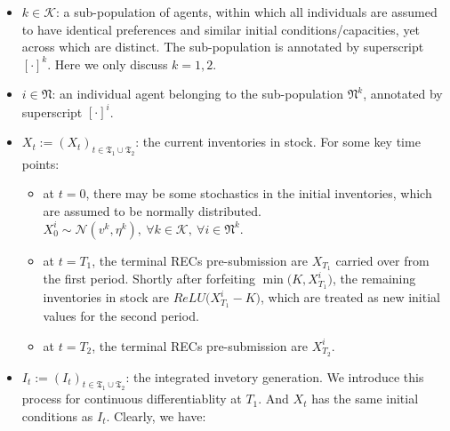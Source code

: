 \documentclass[
]{article}
\providecommand{\tightlist}{%
  \setlength{\itemsep}{0pt}\setlength{\parskip}{0pt}}
\begin{document}
\begin{itemize}
\item
  \(k \in \mathcal{K}\): a sub-population of agents, within which all
  individuals are assumed to have identical preferences and similar
  initial conditions/capacities, yet across which are distinct. The
  sub-population is annotated by superscript \([\cdot]^{k}\). Here we
  only discuss \(k=1,2\).
\item
  \(i \in \mathfrak{N}\): an individual agent belonging to the
  sub-population \(\mathfrak{N}^k\), annotated by superscript
  \([\cdot]^{i}\).
\item
  \(X_t := (X_t)_{t\in\mathfrak{T_1} \cup \mathfrak{T_2}}\): the current
  inventories in stock. For some key time points:

  \begin{itemize}
  \tightlist
  \item
    at \(t=0\), there may be some stochastics in the initial
    inventories, which are assumed to be normally distributed.
    \(X_0^{i} \sim \mathcal{N}(v^k, \eta^k) ,~ \forall k \in \mathcal{K},~\forall i \in \mathfrak{N}^k\).
  \item
    at \(t=T_1\), the terminal RECs pre-submission are \(X_{T_1}\)
    carried over from the first period. Shortly after forfeiting
    \(\min\Big(K,X^i_{T_1}\Big)\), the remaining inventories in stock
    are \(ReLU\Big(X^i_{T_1}-K\Big)\), which are treated as new initial
    values for the second period.
  \item
    at \(t=T_2\), the terminal RECs pre-submission are \(X^i_{T_2}\).
  \end{itemize}
\item
  \(I_t := (I_t)_{t\in\mathfrak{T_1} \cup \mathfrak{T_2}}\): the
  integrated invetory generation. We introduce this process for
  continuous differentiablity at \(T_1\). And \(X_t\) has the same
  initial conditions as \(I_t\). Clearly, we have:


\end{itemize}
\end{document}
